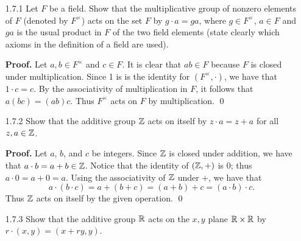 \begin{enumerate}
   \item[1.7.1]   Let $F$ be a field. Show that the multiplicative group of
                  nonzero elements of $F$ (denoted by $F^\times$) acts on the
                  set $F$ by $g \cdot a = ga$, where $g \in F^\times$,
                  $a \in F$ and $ga$ is the usual product in $F$ of the two
                  field elements (state clearly which axioms in the definition
                  of a field are used).

      \textbf{Proof.} Let $a, b \in F^\times$ and $c \in F$. It is clear
      that $ab \in F$ because $F$ is closed under multiplication. Since 1 is
      is the identity for $(F^\times, \cdot)$, we have that $1 \cdot c = c$.
      By the associativity of multiplication in $F$, it follows that
      $a(bc) = (ab)c$. Thus $F^\times$ acts on $F$ by multiplication. \qed
   \item[1.7.2]   Show that the additive group $\mathbb{Z}$ acts on itself by
                  $z \cdot a = z + a$ for all $z, a \in \mathbb{Z}$.

      \textbf{Proof.} Let $a$, $b$, and $c$ be integers. Since $\mathbb{Z}$ is closed
      under addition, we have that $a \cdot b = a + b \in \mathbb{Z}$. Notice that the 
      identity of $(\mathbb{Z}, +)$ is 0; thus $a \cdot 0 = a + 0 = a$. Using the 
      associativity of $\mathbb{Z}$ under +, we have that
      $$a \cdot (b \cdot c) = a + (b + c) = (a + b) + c = (a \cdot b) \cdot c.$$
      Thus $\mathbb{Z}$ acts on itself by the given operation. \qed
   \item[1.7.3]   Show that the additive group $\mathbb{R}$ acts on the $x, y$ plane
                  $\mathbb{R} \times \mathbb{R}$ by $r \cdot (x, y) = (x + ry, y)$.


\end{enumerate}

